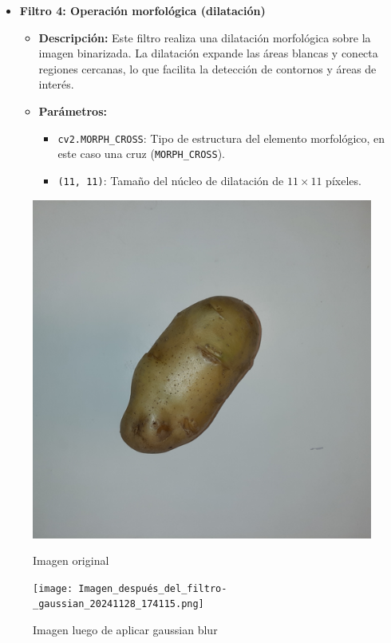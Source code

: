 \documentclass[12pt,a4paper]{article}
\begin{document}
\begin{itemize}
    \item \textbf{Filtro 4: Operación morfológica (dilatación)}
    \begin{itemize}
        \item \textbf{Descripción:} Este filtro realiza una dilatación morfológica sobre la imagen binarizada. La dilatación expande las áreas blancas y conecta regiones cercanas, lo que facilita la detección de contornos y áreas de interés.
        \item \textbf{Parámetros:}
        \begin{itemize}
            \item \texttt{cv2.MORPH\_CROSS}: Tipo de estructura del elemento morfológico, en este caso una cruz (\texttt{MORPH\_CROSS}).
            \item \texttt{(11, 11)}: Tamaño del núcleo de dilatación de \(11 \times 11\) píxeles.
        \end{itemize}
    \end{itemize}
\end{itemize}
\begin{figure}[htbp]
    \centering
    \begin{minipage}{0.43\textwidth}
        \centering
        \includegraphics[width=\textwidth]{Imagen_original_20241128_174112.png}  %
        \caption{Imagen original\textit{}}
    \end{minipage}\hfill
    \begin{minipage}{0.43\textwidth}
        \centering
        \texttt{[image: Imagen\_después\_del\_filtro-\_gaussian\_20241128\_174115.png]}  %
        \caption{Imagen luego de aplicar gaussian blur}
    \end{minipage}
\end{figure}
   
\end{document}
